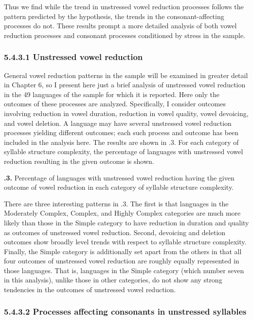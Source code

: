   Thus we find while the trend in unstressed vowel reduction processes follows the pattern predicted by the hypothesis, the trends in the consonant-affecting processes do not. These results prompt a more detailed analysis of both vowel reduction processes and consonant processes conditioned by stress in the sample.

\subsubsection{\textbf{5.4.3.1} \textbf{Unstressed} \textbf{vowel} \textbf{reduction}}

  General vowel reduction patterns in the sample will be examined in greater detail in Chapter 6, so I present here just a brief analysis of unstressed vowel reduction in the 49 languages of the sample for which it is reported. Here only the outcomes of these processes are analyzed. Specifically, I consider outcomes involving reduction in vowel duration, reduction in vowel quality, vowel devoicing, and vowel deletion. A language may have several unstressed vowel reduction processes yielding different outcomes; each such process and outcome has been included in the analysis here. The results are shown in .3. For each category of syllable structure complexity, the percentage of languages with unstressed vowel reduction resulting in the given outcome is shown.

\textbf{.3.} Percentage of languages with unstressed vowel reduction having the given outcome of vowel reduction in each category of syllable structure complexity.

  There are three interesting patterns in .3. The first is that languages in the  Moderately Complex, Complex, and Highly Complex categories are much more likely than those in the Simple category to have reduction in duration and quality as outcomes of unstressed vowel reduction. Second, devoicing and deletion outcomes show broadly level trends with respect to syllable structure complexity. Finally, the Simple category is additionally set apart from the others in that all four outcomes of unstressed vowel reduction are roughly equally represented in those languages. That is, languages in the Simple category (which number seven in this analysis), unlike those in other categories, do not show any strong tendencies in the outcomes of unstressed vowel reduction.

\subsubsection{\textbf{5.4.3.2} \textbf{Processes} \textbf{affecting} \textbf{consonants} \textbf{in} \textbf{unstressed} \textbf{syllables}}

